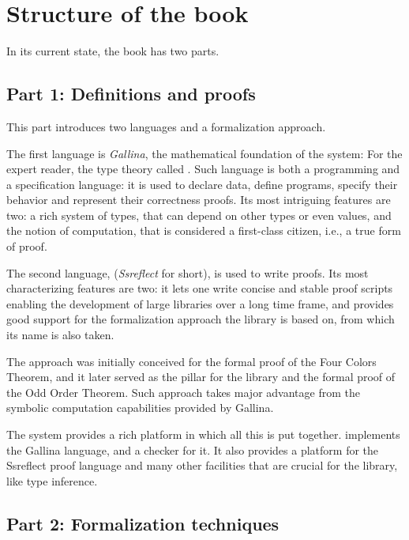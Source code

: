 \section*{Structure of the book}


In its current state, the book has two parts.

\subsection*{Part 1: Definitions and proofs}

This part introduces two languages and a formalization approach.

The first language is \emph{Gallina}, the mathematical foundation of the \Coq{}
system:  For the expert reader, the type theory called \mcbCIC{}.  Such
language is both a programming and a specification language: it is used to
declare data, define programs, specify their behavior and represent their
correctness proofs.  Its most intriguing features are two: a rich system of
types, that can depend on other types or even values, and the notion of
computation, that is considered a first-class citizen, i.e., a true form of
proof.

The second language, \mcbSSR{} (\emph{Ssreflect} for short), is used to write
proofs.  Its most characterizing features are two: it lets one write
concise and stable proof scripts enabling the development of large
libraries over a long time frame, and provides good support for the
formalization approach the \mcbMC{} library is based on, from which
its name is also taken.

The \emph{\mcbSSR{}} approach was initially conceived for the formal proof
of the Four Colors Theorem, and it later served as the pillar for
the \mcbMC{} library and the formal proof of the Odd Order Theorem.
Such approach takes major advantage from the symbolic computation
capabilities provided by Gallina.

The \Coq{} system provides a rich platform in which all this is
put together.  \Coq{} implements the Gallina language, and a checker for it.
It also provides a platform for the Ssreflect proof language and
many other facilities that are crucial for the \mcbMC{} library, like
type inference.

\subsection*{Part 2: Formalization techniques}

